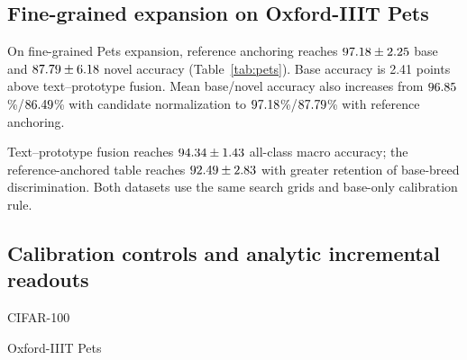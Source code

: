 \documentclass[preprint,review,12pt]{elsarticle}
\begin{document}
\subsection{Fine-grained expansion on Oxford-IIIT Pets}
\begin{table}[t]
\centering
\caption{Five-shot Oxford-IIIT Pets expansion from 15 to 30 breeds under long-tailed base supervision. Values are macro accuracy percentages, mean $\pm$ sample standard deviation across three distinct breed partitions. Grids and the base-only calibration rule are transferred from the CIFAR experiment without dataset-specific search expansion.}
\label{tab:pets}
\resizebox{\linewidth}{!}{}
\end{table}

On fine-grained Pets expansion, reference anchoring reaches $97.18\pm2.25$ base and $87.79\pm6.18$ novel accuracy (Table~\ref{tab:pets}). Base accuracy is 2.41 points above text--prototype fusion. Mean base/novel accuracy also increases from $96.85$\%/$86.49$\% with candidate normalization to $97.18$\%/$87.79$\% with reference anchoring.

Text--prototype fusion reaches $94.34\pm1.43$ all-class macro accuracy; the reference-anchored table reaches $92.49\pm2.83$ with greater retention of base-breed discrimination. Both datasets use the same search grids and base-only calibration rule.

\subsection{Calibration controls and analytic incremental readouts}
\begin{table}[t]
\centering
\caption{Additional five-shot controls with the same frozen encoder, support images, and base-only calibration. Values are mean $\pm$ sample standard deviation across three partitions. The random-projection readout is a controlled frozen RanPAC-style adaptation described in the text.}
\label{tab:controls}
\small
\begin{minipage}{.49\textwidth}\centering CIFAR-100\\[3pt]\resizebox{\linewidth}{!}{}\end{minipage}\hfill
\begin{minipage}{.49\textwidth}\centering Oxford-IIIT Pets\\[3pt]\resizebox{\linewidth}{!}{}\end{minipage}
\end{table}
\end{document}
